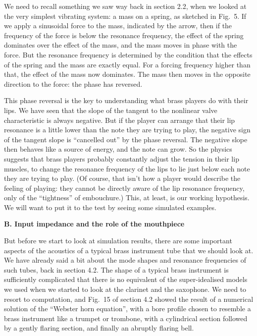   We need to recall something we saw way back in section 2.2, when we looked at 
  the very simplest vibrating system: a mass on a spring, as sketched in Fig.\ 
  5. If we apply a sinusoidal force to the mass, indicated by the arrow, then 
  if the frequency of the force is below the resonance frequency, the effect of 
  the spring dominates over the effect of the mass, and the mass moves in phase 
  with the force. But the resonance frequency is determined by the condition 
  that the effects of the spring and the mass are exactly equal. For a forcing 
  frequency higher than that, the effect of the mass now dominates. The mass 
  then moves in the opposite direction to the force: the phase has reversed. 


  This phase reversal is the key to understanding what brass players do with 
  their lips. We have seen that the slope of the tangent to the nonlinear valve 
  characteristic is always negative. But if the player can arrange that their 
  lip resonance is a little lower than the note they are trying to play, the 
  negative sign of the tangent slope is “cancelled out” by the phase reversal. 
  The negative slope then behaves like a source of energy, and the note can 
  grow. So the physics suggests that brass players probably constantly adjust 
  the tension in their lip muscles, to change the resonance frequency of the 
  lips to lie just below each note they are trying to play. (Of course, that 
  isn't how a player would describe the feeling of playing: they cannot be 
  directly aware of the lip resonance frequency, only of the ``tightness'' of 
  embouchure.) This, at least, is our working hypothesis. We will want to put 
  it to the test by seeing some simulated examples. 

  \textbf{B. Input impedance and the role of the mouthpiece} 

  But before we start to look at simulation results, there are some important 
  aspects of the acoustics of a typical brass instrument tube that we should 
  look at. We have already said a bit about the mode shapes and resonance 
  frequencies of such tubes, back in section 4.2. The shape of a typical brass 
  instrument is sufficiently complicated that there is no equivalent of the 
  super-idealised models we used when we started to look at the clarinet and 
  the saxophone. We need to resort to computation, and Fig.\ 15 of section 4.2 
  showed the result of a numerical solution of the “Webster horn equation”, 
  with a bore profile chosen to resemble a brass instrument like a trumpet or 
  trombone, with a cylindrical section followed by a gently flaring section, 
  and finally an abruptly flaring bell. 

